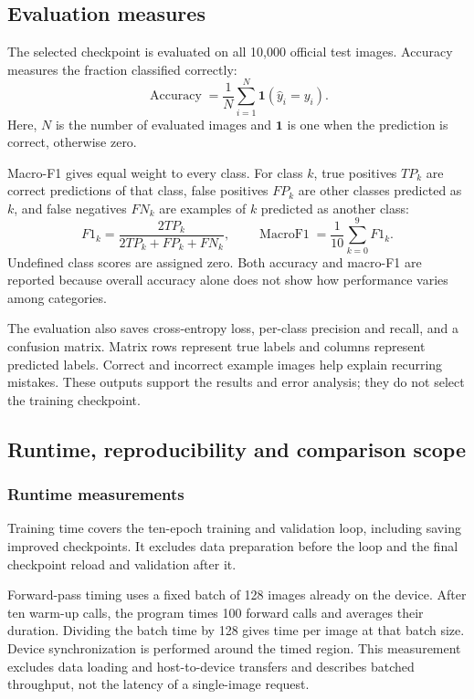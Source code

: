 \subsection{Evaluation measures}
The selected checkpoint is evaluated on all 10,000 official test images.
Accuracy measures the fraction classified correctly:
\[
\operatorname{Accuracy}=\frac{1}{N}\sum_{i=1}^{N}
\mathbf{1}(\hat y_i=y_i).
\]
Here, $N$ is the number of evaluated images and $\mathbf{1}$ is one when the
prediction is correct, otherwise zero.

Macro-F1 gives equal weight to every class. For class $k$, true positives
$TP_k$ are correct predictions of that class, false positives $FP_k$ are other
classes predicted as $k$, and false negatives $FN_k$ are examples of $k$
predicted as another class:
\[
F1_k=\frac{2TP_k}{2TP_k+FP_k+FN_k},
\qquad
\operatorname{MacroF1}=\frac{1}{10}\sum_{k=0}^{9}F1_k.
\]
Undefined class scores are assigned zero. Both accuracy and macro-F1 are
reported because overall accuracy alone does not show how performance varies
among categories.

The evaluation also saves cross-entropy loss, per-class precision and recall,
and a confusion matrix. Matrix rows represent true labels and columns represent
predicted labels. Correct and incorrect example images help explain recurring
mistakes. These outputs support the results and error analysis; they do not
select the training checkpoint.

\clearpage
\subsection{Runtime, reproducibility and comparison scope}
\subsubsection{Runtime measurements}
Training time covers the ten-epoch training and validation loop, including
saving improved checkpoints. It excludes data preparation before the loop and
the final checkpoint reload and validation after it.

Forward-pass timing uses a fixed batch of 128 images already on the device.
After ten warm-up calls, the program times 100 forward calls and averages their
duration. Dividing the batch time by 128 gives time per image at that batch
size. Device synchronization is performed around the timed region. This
measurement excludes data loading and host-to-device transfers and describes
batched throughput, not the latency of a single-image request.

